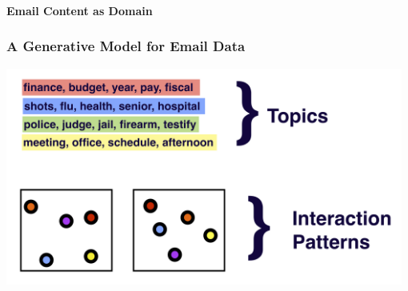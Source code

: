 \documentclass[xcolor={table}, fleqn]{beamer}
\newenvironment{changemargin}[2]{%
  \begin{list}{}{%
    \setlength{\topsep}{0pt}%
    \setlength{\leftmargin}{#1}%
    \setlength{\rightmargin}{#2}%
    \setlength{\listparindent}{\parindent}%
    \setlength{\itemindent}{\parindent}%
    \setlength{\parsep}{\parskip}%
  }%
  \item[]}{\end{list}}
\begin{document}
\begin{frame}\frametitle{}
	\begin{center}
		\Huge\textbf{Email Content as Domain}
	\end{center}
\end{frame}


\begin{frame}\frametitle{A Generative Model for Email Data}
	\begin{changemargin}{-1cm}{ -1cm}
    \centering
	\includegraphics[width=0.98\textwidth]{images/Gen_Proc_1.png}
	\end{changemargin} 
\end{frame}


%
\end{document}
